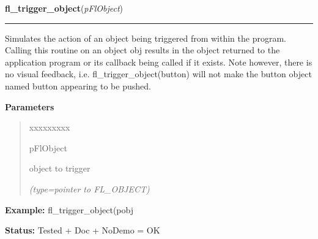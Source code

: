 \hspace{.8\funcindent}\begin{boxedminipage}{\funcwidth}

    \raggedright \textbf{fl\_trigger\_object}(\textit{pFlObject})

    \vspace{-1.5ex}

    \rule{\textwidth}{0.5\fboxrule}
\setlength{\parskip}{2ex}
    Simulates the action of an object being triggered from within the 
    program. Calling this routine on an object obj results in the object 
    returned to the application program or its callback being called if it 
    exists. Note however, there is no visual feedback, i.e. 
    fl\_trigger\_object(button) will not make the button object named 
    button appearing to be pushed.

\setlength{\parskip}{1ex}
      \textbf{Parameters}
      \vspace{-1ex}

      \begin{quote}
        \begin{Ventry}{xxxxxxxxx}

          \item[pFlObject]

          object to trigger

            {\it (type=pointer to FL\_OBJECT)}

        \end{Ventry}

      \end{quote}

\textbf{Example:} fl\_trigger\_object(pobj



\textbf{Status:} Tested + Doc + NoDemo = OK



    \end{boxedminipage}

    \label{xformslib:flbasic:fl_activate_object}

    \vspace{0.5ex}


